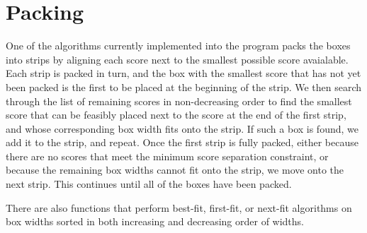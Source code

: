 \documentclass[a4paper, 11pt, twoside, onecolumn, openany]{article}
\begin{document}
\section{Packing}

One of the algorithms currently implemented into the program packs the boxes into strips by aligning each score next to the smallest possible score avaialable. Each strip is packed in turn, and the box with the smallest score that has not yet been packed is the first to be placed at the beginning of the strip. We then search through the list of remaining scores in non-decreasing order to find the smallest score that can be feasibly placed next to the score at the end of the first strip, and whose corresponding box width fits onto the strip. If such a box is found, we add it to the strip, and repeat. Once the first strip is fully packed, either because there are no scores that meet the minimum score separation constraint, or because the remaining box widths cannot fit onto the strip, we move onto the next strip. This continues until all of the boxes have been packed. 

There are also functions that perform best-fit, first-fit, or next-fit algorithms on box widths sorted in both increasing and decreasing order of widths.
\end{document}
